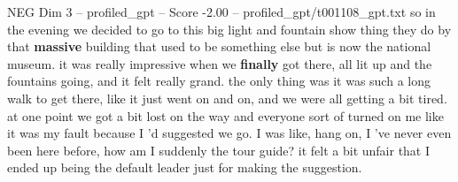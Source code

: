 \begin{textsample}{NEG Dim 3 – profiled\_gpt – Score -2.00 – profiled\_gpt/t001108\_gpt.txt}  \label{ex:f3_neg_022}
so in the evening we decided to go to this big light and fountain show thing they do by that \textbf{massive} building that used to be something else but is now the national museum. it was really impressive when we \textbf{finally} got there, all lit up and the fountains going, and it felt really grand. the only thing was it was such a long walk to get there, like it just went on and on, and we were all getting a bit tired. at one point we got a bit lost on the way and everyone sort of turned on me like it was my fault because I ’d suggested we go.
I was like, hang on, I ’ve never even been here before, how am I suddenly the tour guide? it felt a bit unfair that I ended up being the default leader just for making the suggestion.

\end{textsample}
